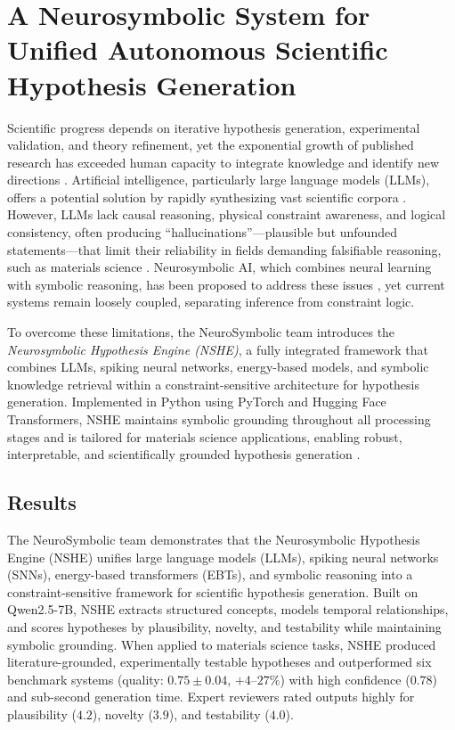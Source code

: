 \section{A Neurosymbolic System for Unified Autonomous Scientific Hypothesis Generation}

Scientific progress depends on iterative hypothesis generation, experimental validation, and theory refinement, yet the exponential growth of published research has exceeded human capacity to integrate knowledge and identify new directions \cite{Fortunato2018}. Artificial intelligence, particularly large language models (LLMs), offers a potential solution by rapidly synthesizing vast scientific corpora \cite{brown2020language}. However, LLMs lack causal reasoning, physical constraint awareness, and logical consistency, often producing ``hallucinations''—plausible but unfounded statements—that limit their reliability in fields demanding falsifiable reasoning, such as materials science \cite{Bender2021}. Neurosymbolic AI, which combines neural learning with symbolic reasoning, has been proposed to address these issues \cite{Garcez2022}, yet current systems remain loosely coupled, separating inference from constraint logic.

To overcome these limitations, the NeuroSymbolic team introduces the \textit{Neurosymbolic Hypothesis Engine (NSHE)}, a fully integrated framework that combines LLMs, spiking neural networks, energy-based models, and symbolic knowledge retrieval within a constraint-sensitive architecture for hypothesis generation. Implemented in Python using PyTorch and Hugging Face Transformers, NSHE maintains symbolic grounding throughout all processing stages and is tailored for materials science applications, enabling robust, interpretable, and scientifically grounded hypothesis generation \cite{Butler2018}.

\subsection*{Results}

The NeuroSymbolic team demonstrates that the Neurosymbolic Hypothesis Engine (NSHE) unifies large language models (LLMs), spiking neural networks (SNNs), energy-based transformers (EBTs), and symbolic reasoning into a constraint-sensitive framework for scientific hypothesis generation. Built on Qwen2.5-7B, NSHE extracts structured concepts, models temporal relationships, and scores hypotheses by plausibility, novelty, and testability while maintaining symbolic grounding. When applied to materials science tasks, NSHE produced literature-grounded, experimentally testable hypotheses and outperformed six benchmark systems (quality: $0.75 \pm 0.04$, $+4$--$27\%$) with high confidence ($0.78$) and sub-second generation time. Expert reviewers rated outputs highly for plausibility ($4.2$), novelty ($3.9$), and testability ($4.0$).


